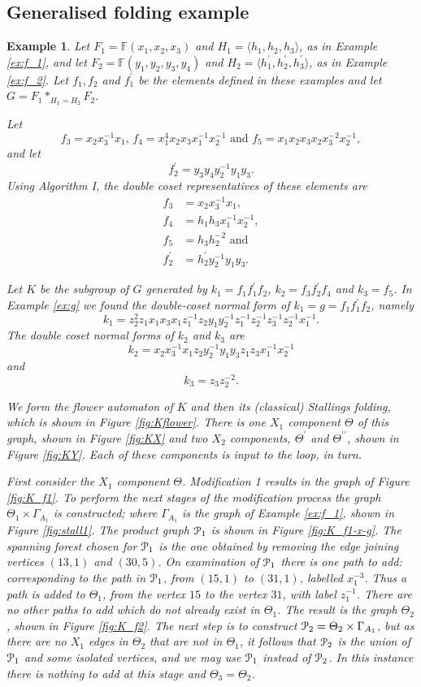 \documentclass[a4paper,12pt]{article}
\newcommand{\G}{\Gamma }
\newcommand{\T}{\Theta }
\newcommand{\cP}{{\cal{P}}}
\newtheorem{exam}[theorem]{Example}
\newenvironment{example}{\begin{exam} \rm}{\end{exam}}
\numberwithin{equation}{section}
\numberwithin{figure}{section}
\newcommand{\FF}{\ensuremath{\mathbb{F}}}
\newcommand{\la}{\langle}
\newcommand{\ra}{\rangle}
\begin{document}
\subsection{Generalised folding example}
\begin{example}\label{ex:K}
Let $F_1=\FF(x_1,x_2,x_3)$ and $H_1=\la h_1,h_2,h_3\ra$,
as in Example \ref{ex:f_1}, and let $F_2=\FF(y_1,y_2,y_3,y_4)$ and
$H_2=\la h_1^\prime, h_2^\prime, h_3^\prime\ra$, as in Example \ref{ex:f_2}.
Let $f_1,f_2$ and $f_1^\prime$ be the elements defined in these examples
 and let $G=F_1\ast_{H_1=H_2} F_2$.

Let
\[f_3=x_2x_3^{-1}x_1,\, f_4= x_1^4 x_2 x_3 x_1^{-1} x_2^{-1}
\textrm{ and } f_5=x_1x_2x_3x_2x_3^{-2}x_2^{-1},\]
and let
\[ f_2^\prime =y_3y_4y_2^{-1}y_1y_3.\]
Using Algorithm I, the double coset representatives of these elements are
\begin{align*}
f_3 & = x_2x_3^{-1}x_1,\\
f_4 &= h_1h_3 x_1^{-1}x_2^{-1},\\
f_5 &= h_3h_2^{-2}\textrm{ and }\\
f_2^\prime &= h_2^\prime y_2^{-1}y_1y_3.
\end{align*}

Let $K$ be the subgroup of $G$ generated by $k_1=f_1f_1^\prime f_2$,
$k_2= f_3f_2^\prime f_4$ and $k_3=f_5$.
In Example \ref{ex:g} we found the double-coset normal form of
$k_1=g=f_1f_1^\prime f_2$, namely
\[k_1=z_2^2 z_1  x_1 x_3 x_1 z_1^{-1}
z_2y_1y_2^{-1} z_1^{-1}z_2^{-1}
z_3^{-1}z_2^{-1} x_1^{-1}.\]
The double coset normal forms of $k_2$ and $k_3$ are
\[k_2=  x_2x_3^{-1}x_1  z_2 y_2^{-1}y_1y_3 z_1z_3 x_1^{-1}x_2^{-1}\]
and
\[k_3 = z_3z_2^{-2}.\]

We form the flower automaton of $K$ and then its (classical) Stallings folding,
which is
shown in Figure \ref{fig:Kflower}.
There is one $X_1$ component $\Theta$ of this graph, shown in Figure \ref{fig:KX}
and two $X_2$ components, $\Theta^\prime$ and $\Theta^{\prime\prime}$, 
shown in Figure \ref{fig:KY}. Each of these components is input to the loop, in turn.

First consider the $X_1$ component $\Theta$. Modification 1
results in the graph of Figure \ref{fig:K_f1}. To perform the next
stages of the  modification process the graph $\Theta_1 \times
\G_{A_1}$ is constructed; where $\G_{A_1}$ is the graph of Example
\ref{ex:f_1}, shown in Figure \ref{fig:stall1}. The product graph
$\cP_1$ is shown in Figure \ref{fig:K_f1-x-g}. The spanning forest
chosen for $\cP_1$ is the one obtained by removing the edge
joining vertices $(13,1)$ and $(30,5)$. On examination of $\cP_1$
there is one path to add: corresponding to the path in $\cP_1$,
from $(15,1)$ to $(31,1)$, labelled $x_1^{-3}$. Thus a path is
added to $\T_1$, from the vertex $15$ to the vertex $31$, with
label $z_1^{-1}$. There are no other paths to add which do not
already exist in $\T_1$. The result is  the graph $\Theta_2$,
shown in Figure \ref{fig:K_f2}. The next step is to construct
$\cP_2=\T_2\times \G_{A_1}$, but as there are no $X_1$ edges in
$\T_2$ that are not in $\T_1$, it follows that  $\cP_2$ is the
union of $\cP_1$ and some isolated vertices, and we may use
$\cP_1$ instead of $\cP_2$. In this instance there is nothing to
add at this stage and $\T_3=\T_2$.


\end{example}
\end{document}
